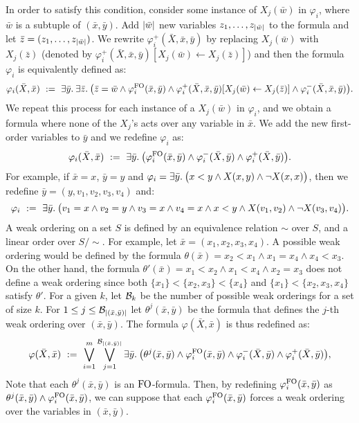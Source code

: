 \medskip

 In order to satisfy this condition, consider some instance of $X_j(\bar{w})$ in $\varphi_i$, where $\bar{w}$ is a subtuple of $(\bar{x},\bar{y})$. Add $\vert \bar{w} \vert$ new variables $z_1,\ldots,z_{\vert \bar{w} \vert}$ to the formula and let $\bar{z} = (z_1,\ldots,z_{\vert \bar{w} \vert})$. We rewrite $\varphi_i^{+}(\bar{X},\bar{x},\bar{y})$ by replacing $X_j(\bar{w})$ with $X_j(\bar{z})$ (denoted by $\varphi_i^{+}(\bar{X},\bar{x},\bar{y})[X_j(\bar{w}) \leftarrow X_j(\bar{z})]$) and then the formula $\varphi_i$ is equivalently defined as:
$$
\varphi_i(\bar{X},\bar{x}) \ := \ \exists{\bar{y}}.\: \exists{\bar{z}}.\: \big( \bar{z} = \bar{w} \wedge \varphi_i^{{\rm FO}}(\bar{x},\bar{y}) \wedge \varphi_i^{+}(\bar{X},\bar{x},\bar{y})[X_j(\bar{w}) \leftarrow X_j(\bar{z})] \wedge
\varphi_i^{-}(\bar{X},\bar{x},\bar{y}) \big).
$$
We repeat this process for each instance of a $X_j(\bar{w})$ in $\varphi_i$, and we obtain a formula where none of the $X_j$'s acts over any variable in $\bar{x}$. We add the new first-order variables to $\bar{y}$ and we redefine $\varphi_i$ as:
$$
\varphi_i(\bar{X},\bar{x}) \ := \  \exists{\bar{y}}.\: \big( \varphi_i^{{\rm FO}}(\bar{x},\bar{y}) \wedge \varphi_i^{-}(\bar{X},\bar{y}) \wedge \varphi_i^{+}(\bar{X},\bar{y})\big).
$$
For example, if $\bar{x} = x$, $\bar{y} = y$ and $\varphi_i = \exists{\bar{y}}.\: \big( x < y \wedge  X(x,y)\wedge \neg X(x,x)\big)$, then we redefine $\bar{y} = (y,v_1,v_2,v_3,v_4)$ and:
$$
\varphi_i \ := \ \exists{\bar{y}}.\:\big( v_1 = x \wedge v_2 = y \wedge v_3 = x \wedge v_4 = x \wedge x < y  \wedge  X(v_1,v_2) \wedge \neg X(v_3,v_4)\big).
$$
 A weak ordering on a set $S$ is defined by an equivalence relation $\sim$ over $S$, and a linear order over $S/\!\sim$. For example, let $\bar{x} = (x_1,x_2,x_3,x_4)$. A possible weak ordering would be defined by the formula $\theta(\bar{x}) = x_2 < x_1 \wedge x_1 = x_4 \wedge x_4 < x_3$. On the other hand, the formula $\theta'(\bar{x}) = x_1 < x_2 \wedge x_1 < x_4 \wedge x_2 = x_3$ does not define a weak ordering since both $\{x_1\}<\{x_2,x_3\}<\{x_4\}$ and $\{x_1\} < \{x_2,x_3,x_4\}$ satisfy $\theta'$.
For a given $k$, let $\mathcal{B}_k$ be the number of possible weak orderings for a set of size $k$. For $1 \leq j \leq \mathcal{B}_{\vert (\bar{x},\bar{y}) \vert}$ 
let $\theta^j(\bar{x},\bar{y})$ be the formula that defines the $j$-th weak ordering over $(\bar{x},\bar{y})$. 
The formula $\varphi(\bar{X},\bar{x})$ is thus redefined as:
$$
\varphi(\bar{X},\bar{x}) \ := \ \bigvee_{i = 1}^m \bigvee_{j = 1}^{\mathcal{B}_{\vert (\bar{x},\bar{y}) \vert}} \exists{\bar{y}}.\: \big(\theta^j(\bar{x},\bar{y})\wedge \varphi_i^{{\rm FO}}(\bar{x},\bar{y}) \wedge \varphi_i^{-}(\bar{X},\bar{y}) \wedge \varphi_i^{+}(\bar{X},\bar{y})\big),
$$
Note that each $\theta^j(\bar{x},\bar{y})$ is an ${\rm FO}$-formula.
Then, by redefining $\varphi_i^{{\rm FO}}(\bar{x},\bar{y})$  as $\theta^j(\bar{x},\bar{y})\wedge \varphi_i^{{\rm FO}}(\bar{x},\bar{y})$, we can suppose that each $\varphi_i^{{\rm FO}}(\bar{x},\bar{y})$ forces a weak ordering over the variables in $(\bar{x},\bar{y})$.

